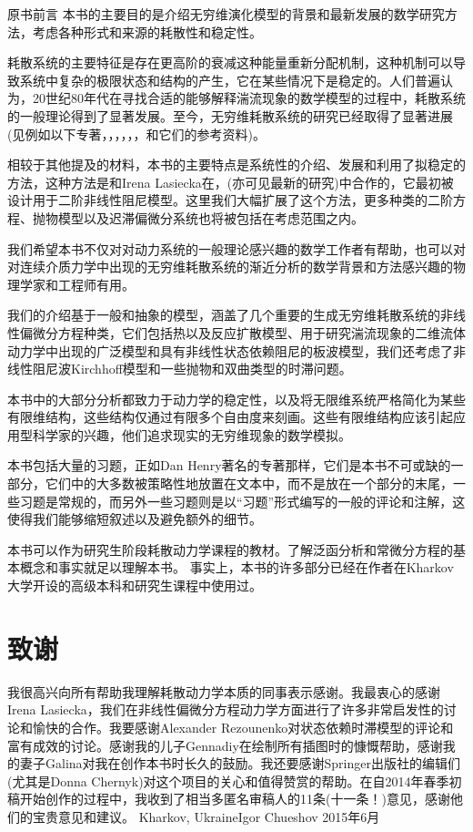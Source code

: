 \begin{PreChapter}{原书前言}
	本书的主要目的是介绍无穷维演化模型的背景和最新发展的数学研究方法，考虑各种形式和来源的耗散性和稳定性。
	
	耗散系统的主要特征是存在更高阶的衰减这种能量重新分配机制，这种机制可以导致系统中复杂的极限状态和结构的产生，它在某些情况下是稳定的。人们普遍认为，20世纪80年代在寻找合适的能够解释湍流现象的数学模型的过程中，耗散系统的一般理论得到了显著发展。至今，无穷维耗散系统的研究已经取得了显著进展(见例如以下专著\cite{Babin92}，\cite{Chepyzhov02}，\cite{Hale88}，\cite{Ladyzhenskaya91}，\cite{Robinson01}，\cite{Sell02}，\cite{Temam97}和它们的参考资料)。
	
	相较于其他提及的材料，本书的主要特点是系统性的介绍、发展和利用了拟稳定的方法，这种方法是和Irena Lasiecka在\cite{Chueshov08}，\cite{Chueshov10}(亦可见最新的研究\cite{Chueshov13})中合作的，它最初被设计用于二阶非线性阻尼模型。这里我们大幅扩展了这个方法，更多种类的二阶方程、抛物模型以及迟滞偏微分系统也将被包括在考虑范围之内。
	
	我们希望本书不仅对对动力系统的一般理论感兴趣的数学工作者有帮助，也可以对对连续介质力学中出现的无穷维耗散系统的渐近分析的数学背景和方法感兴趣的物理学家和工程师有用。
	
	我们的介绍基于一般和抽象的模型，涵盖了几个重要的生成无穷维耗散系统的非线性偏微分方程种类，它们包括热以及反应扩散模型、用于研究湍流现象的二维流体动力学中出现的广泛模型和具有非线性状态依赖阻尼的板波模型，我们还考虑了非线性阻尼波Kirchhoff模型和一些抛物和双曲类型的时滞问题。
	
	本书中的大部分分析都致力于动力学的稳定性，以及将无限维系统严格简化为某些有限维结构，这些结构仅通过有限多个自由度来刻画。这些有限维结构应该引起应用型科学家的兴趣，他们追求现实的无穷维现象的数学模拟。
	
	本书包括大量的习题，正如Dan Henry著名的专著\cite{Henry81}那样，它们是本书不可或缺的一部分，它们中的大多数被策略性地放置在文本中，而不是放在一个部分的末尾，一些习题是常规的，而另外一些习题则是以“习题”形式编写的一般的评论和注解，这使得我们能够缩短叙述以及避免额外的细节。
	
	本书可以作为研究生阶段耗散动力学课程的教材。了解泛函分析和常微分方程的基本概念和事实就足以理解本书。 事实上，本书的许多部分已经在作者在Kharkov大学开设的高级本科和研究生课程中使用过。

	\section*{致谢}

	我很高兴向所有帮助我理解耗散动力学本质的同事表示感谢。我最衷心的感谢Irena Lasiecka，我们在非线性偏微分方程动力学方面进行了许多非常启发性的讨论和愉快的合作。我要感谢Alexander Rezounenko对状态依赖时滞模型的评论和富有成效的讨论。感谢我的儿子Gennadiy在绘制所有插图时的慷慨帮助，感谢我的妻子Galina对我在创作本书时长久的鼓励。我还要感谢Springer出版社的编辑们(尤其是Donna Chernyk)对这个项目的关心和值得赞赏的帮助。在自2014年春季初稿开始创作的过程中，我收到了相当多匿名审稿人的11条(十一条！)意见，感谢他们的宝贵意见和建议。
	\newline\newline
	Kharkov, Ukraine\hfill Igor Chueshov
	\newline
	2015年6月
\end{PreChapter}	
	
	
